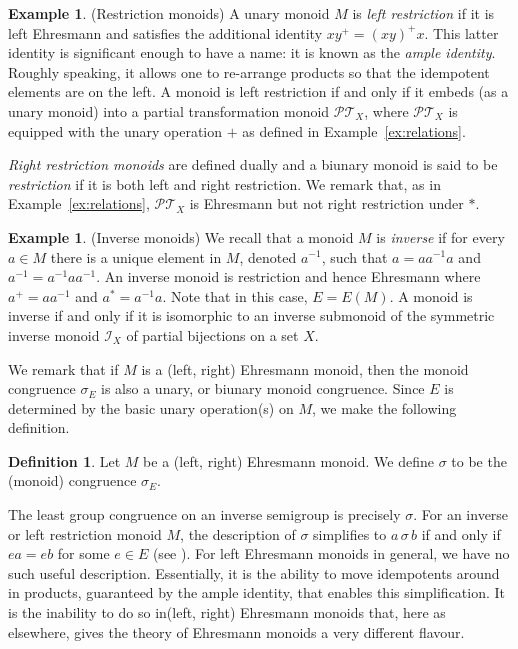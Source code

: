 \documentclass[12pt]{amsart}
\theoremstyle{definition}
\newtheorem{ex}[them]{Example}
\newtheorem{defn}[them]{Definition}
\theoremstyle{definition}
\numberwithin{them}{section}
\numberwithin{equation}{section}
\begin{document}
\begin{ex}\label{ex:restriction} (Restriction  monoids) A unary monoid $M$ is {\em left restriction} if it is left Ehresmann and satisfies the additional identity $xy^+=(xy)^+x$. This latter identity is significant enough to have a name: it is   known as the {\em ample identity}. 
Roughly speaking, it allows one to re-arrange products so that the idempotent elements are on the left. A monoid is left restriction if and only if it embeds (as a unary monoid) into a partial transformation monoid $\mathcal{PT}_X$,  where $\mathcal{PT}_X$ is equipped with the unary operation $+$ as defined in Example~\ref{ex:relations}.


{\em Right restriction monoids} are defined dually and a biunary monoid is said to be {\em restriction} if it is both left and right restriction.  We remark that, as in Example~\ref{ex:relations},  $\mathcal{PT}_X$ is Ehresmann but not right restriction under $*$.  \end{ex}
 
\begin{ex}\label{ex:inverse}(Inverse monoids)
 We recall that a  monoid $M$ is {\em inverse} if for every $a\in M$ there is a unique element in $M$, denoted $a^{-1}$,
such that $a=aa^{-1}a$ and $a^{-1}=a^{-1}aa^{-1}$. An inverse monoid is restriction and hence Ehresmann where
$a^+=aa^{-1}$ and $a^*=a^{-1}a$.  Note that in this case, $E=E(M)$. 
A monoid is inverse if and only if it is isomorphic to an inverse submonoid of the symmetric inverse monoid $\mathcal{I}_X$ of partial bijections on a set $X$. \end{ex}




We remark that if $M$ is a (left, right) Ehresmann monoid, then the monoid congruence  $\sigma_E$ is also a unary, or biunary monoid congruence.   Since $E$ is determined by the  basic unary operation(s) on $M$, we make the  following  definition. 



\begin{defn}\label{defn:sigmaone}
Let $M$ be a (left, right) Ehresmann monoid.  We define $\sigma$ to be the (monoid) congruence  $\sigma_E$. 

\end{defn}


The least group congruence
 on an inverse semigroup is precisely $\sigma$. 
For an inverse or left restriction monoid $M$, the description of $\sigma$ simplifies to $a\, \sigma\, b$ if and only if $ea = eb$ for some $e  \in E$ (see \cite{G,H}). For left Ehresmann monoids in general, we have no such useful description. Essentially, it is the ability to move idempotents around in products,  guaranteed by the ample identity, that enables this simplification. It is the inability to do so in(left, right)  Ehresmann monoids that, here as elsewhere, gives the theory of Ehresmann monoids a very different flavour.
\end{document}
